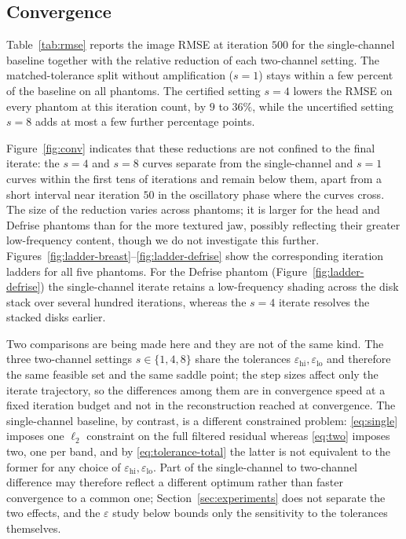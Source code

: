 \documentclass{article}
\begin{document}
\subsection{Convergence}

Table~\ref{tab:rmse} reports the image RMSE at iteration $500$ for the single-channel baseline together with the relative reduction of each two-channel setting. The matched-tolerance split without amplification ($s=1$) stays within a few percent of the baseline on all phantoms. The certified setting $s=4$ lowers the RMSE on every phantom at this iteration count, by $9$ to $36\%$, while the uncertified setting $s=8$ adds at most a few further percentage points.

Figure~\ref{fig:conv} indicates that these reductions are not confined to the final iterate: the $s=4$ and $s=8$ curves separate from the single-channel and $s=1$ curves within the first tens of iterations and remain below them, apart from a short interval near iteration $50$ in the oscillatory phase where the curves cross. The size of the reduction varies across phantoms; it is larger for the head and Defrise phantoms than for the more textured jaw, possibly reflecting their greater low-frequency content, though we do not investigate this further. Figures~\ref{fig:ladder-breast}--\ref{fig:ladder-defrise} show the corresponding iteration ladders for all five phantoms. For the Defrise phantom (Figure~\ref{fig:ladder-defrise}) the single-channel iterate retains a low-frequency shading across the disk stack over several hundred iterations, whereas the $s=4$ iterate resolves the stacked disks earlier.

Two comparisons are being made here and they are not of the same kind. The three two-channel settings $s\in\{1,4,8\}$ share the tolerances $\varepsilon_{\mathrm{hi}},\varepsilon_{\mathrm{lo}}$ and therefore the same feasible set and the same saddle point; the step sizes affect only the iterate trajectory, so the differences among them are in convergence speed at a fixed iteration budget and not in the reconstruction reached at convergence. The single-channel baseline, by contrast, is a different constrained problem: \eqref{eq:single} imposes one $\ell_2$ constraint on the full filtered residual whereas \eqref{eq:two} imposes two, one per band, and by \eqref{eq:tolerance-total} the latter is not equivalent to the former for any choice of $\varepsilon_{\mathrm{hi}},\varepsilon_{\mathrm{lo}}$. Part of the single-channel to two-channel difference may therefore reflect a different optimum rather than faster convergence to a common one; Section~\ref{sec:experiments} does not separate the two effects, and the $\varepsilon$ study below bounds only the sensitivity to the tolerances themselves.
\end{document}

